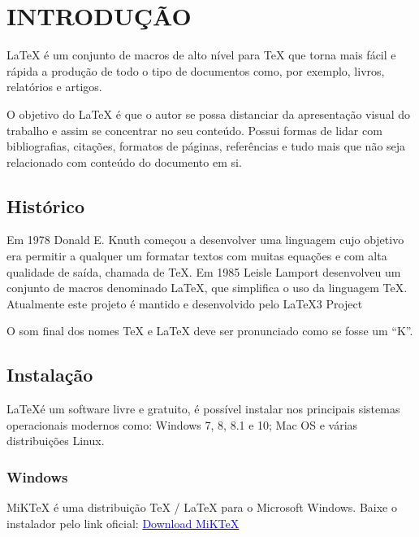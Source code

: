 
\chapter{INTRODUÇÃO}
\label{chap:introducao}

\LaTeX{} é um conjunto de macros de alto nível para \TeX \xspace que torna mais fácil e rápida a produção de todo o tipo de documentos como, por exemplo, livros, relatórios e artigos.

O objetivo do \LaTeX \xspace é que o autor se possa distanciar da apresentação visual do trabalho e assim se concentrar no seu conteúdo. Possui formas de lidar com bibliografias, citações, formatos de páginas, referências e tudo mais que não seja relacionado com conteúdo do documento em si.

\section{Histórico}
\label{sec:Histórico}

Em 1978 Donald E. Knuth começou a desenvolver uma linguagem cujo objetivo era permitir a qualquer um formatar textos com muitas equações e com alta qualidade de saída, chamada de \TeX. Em 1985 Leisle Lamport desenvolveu um conjunto de macros denominado \LaTeX \xspace, que simplifica o uso da linguagem \TeX \xspace. Atualmente este projeto é mantido e desenvolvido pelo \LaTeX3 \xspace Project

O som final dos nomes \TeX \xspace e \LaTeX \xspace deve ser pronunciado como se fosse um “K”.

\section{Instalação}
\label{sec:Instalação}

\LaTeX é um software livre e gratuito, é possível instalar nos  principais sistemas operacionais modernos como: Windows 7, 8, 8.1 e 10; Mac OS e várias distribuições Linux.

\subsection{Windows}

MiKTeX é uma distribuição TeX / LaTeX para o Microsoft Windows. Baixe o instalador pelo link oficial: \href{https://miktex.org/download}{\textcolor{blue}{Download MiKTeX}}

